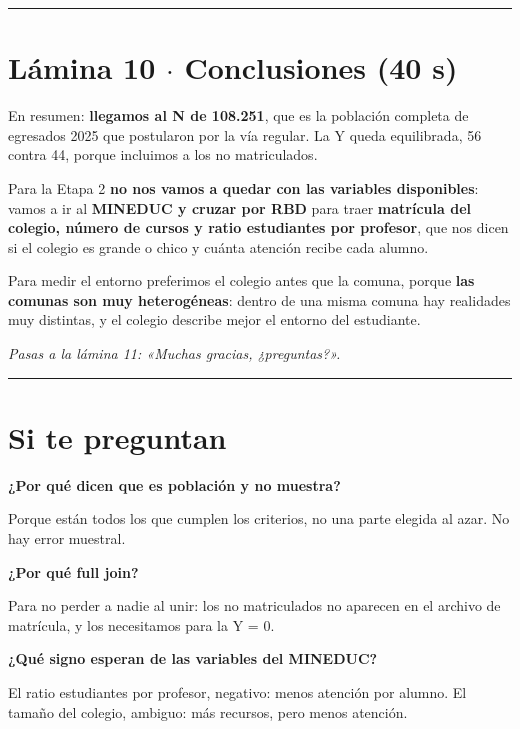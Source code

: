 \documentclass[11pt]{article}
\begin{document}
\medskip\hrule\medskip

\section*{Lámina 10 $\cdot$ Conclusiones (40 s)}

\begin{guion}En resumen: \textbf{llegamos al N de 108.251}, que es la población completa de egresados 2025 que postularon por la vía regular. La Y queda equilibrada, 56 contra 44, porque incluimos a los no matriculados.\par Para la Etapa 2 \textbf{no nos vamos a quedar con las variables disponibles}: vamos a ir al \textbf{MINEDUC y cruzar por RBD} para traer \textbf{matrícula del colegio, número de cursos y ratio estudiantes por profesor}, que nos dicen si el colegio es grande o chico y cuánta atención recibe cada alumno.\par Para medir el entorno preferimos el colegio antes que la comuna, porque \textbf{las comunas son muy heterogéneas}: dentro de una misma comuna hay realidades muy distintas, y el colegio describe mejor el entorno del estudiante.\end{guion}

\textit{Pasas a la lámina 11: «Muchas gracias, ¿preguntas?».}\par

\medskip\hrule\medskip

\section*{Si te preguntan}

\textbf{¿Por qué dicen que es población y no muestra?}\par
\begin{guion}Porque están todos los que cumplen los criterios, no una parte elegida al azar. No hay error muestral.\end{guion}

\textbf{¿Por qué full join?}\par
\begin{guion}Para no perder a nadie al unir: los no matriculados no aparecen en el archivo de matrícula, y los necesitamos para la Y = 0.\end{guion}

\textbf{¿Qué signo esperan de las variables del MINEDUC?}\par
\begin{guion}El ratio estudiantes por profesor, negativo: menos atención por alumno. El tamaño del colegio, ambiguo: más recursos, pero menos atención.\end{guion}
\end{document}
